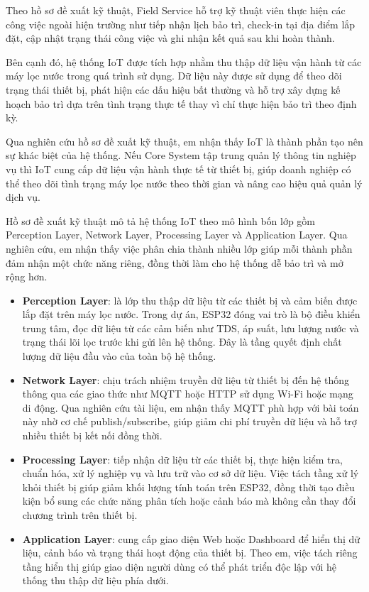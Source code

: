 
Theo hồ sơ đề xuất kỹ thuật, Field Service hỗ trợ kỹ thuật viên thực hiện các công việc ngoài hiện trường như tiếp nhận lịch bảo trì, check-in tại địa điểm lắp đặt, cập nhật trạng thái công việc và ghi nhận kết quả sau khi hoàn thành.

Bên cạnh đó, hệ thống IoT được tích hợp nhằm thu thập dữ liệu vận hành từ các máy lọc nước trong quá trình sử dụng. Dữ liệu này được sử dụng để theo dõi trạng thái thiết bị, phát hiện các dấu hiệu bất thường và hỗ trợ xây dựng kế hoạch bảo trì dựa trên tình trạng thực tế thay vì chỉ thực hiện bảo trì theo định kỳ.

Qua nghiên cứu hồ sơ đề xuất kỹ thuật, em nhận thấy IoT là thành phần tạo nên sự khác biệt của hệ thống. Nếu Core System tập trung quản lý thông tin nghiệp vụ thì IoT cung cấp dữ liệu vận hành thực tế từ thiết bị, giúp doanh nghiệp có thể theo dõi tình trạng máy lọc nước theo thời gian và nâng cao hiệu quả quản lý dịch vụ.


Hồ sơ đề xuất kỹ thuật mô tả hệ thống IoT theo mô hình bốn lớp gồm Perception Layer, Network Layer, Processing Layer và Application Layer. Qua nghiên cứu, em nhận thấy việc phân chia thành nhiều lớp giúp mỗi thành phần đảm nhận một chức năng riêng, đồng thời làm cho hệ thống dễ bảo trì và mở rộng hơn.

\begin{itemize}
    \item \textbf{Perception Layer}: là lớp thu thập dữ liệu từ các thiết bị và cảm biến được lắp đặt trên máy lọc nước. Trong dự án, ESP32 đóng vai trò là bộ điều khiển trung tâm, đọc dữ liệu từ các cảm biến như TDS, áp suất, lưu lượng nước và trạng thái lõi lọc trước khi gửi lên hệ thống. Đây là tầng quyết định chất lượng dữ liệu đầu vào của toàn bộ hệ thống.

    \item \textbf{Network Layer}: chịu trách nhiệm truyền dữ liệu từ thiết bị đến hệ thống thông qua các giao thức như MQTT hoặc HTTP sử dụng Wi-Fi hoặc mạng di động. Qua nghiên cứu tài liệu, em nhận thấy MQTT phù hợp với bài toán này nhờ cơ chế publish/subscribe, giúp giảm chi phí truyền dữ liệu và hỗ trợ nhiều thiết bị kết nối đồng thời.

    \item \textbf{Processing Layer}: tiếp nhận dữ liệu từ các thiết bị, thực hiện kiểm tra, chuẩn hóa, xử lý nghiệp vụ và lưu trữ vào cơ sở dữ liệu. Việc tách tầng xử lý khỏi thiết bị giúp giảm khối lượng tính toán trên ESP32, đồng thời tạo điều kiện bổ sung các chức năng phân tích hoặc cảnh báo mà không cần thay đổi chương trình trên thiết bị.

    \item \textbf{Application Layer}: cung cấp giao diện Web hoặc Dashboard để hiển thị dữ liệu, cảnh báo và trạng thái hoạt động của thiết bị. Theo em, việc tách riêng tầng hiển thị giúp giao diện người dùng có thể phát triển độc lập với hệ thống thu thập dữ liệu phía dưới.
\end{itemize}

